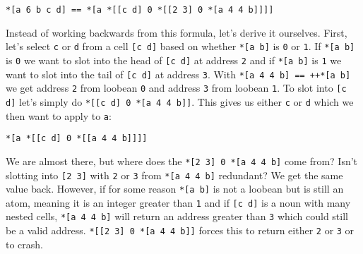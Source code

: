\documentclass[twoside]{article}
\begin{document}
\begin{lstlisting}[style=listingblock]
*[a 6 b c d] == *[a *[[c d] 0 *[[2 3] 0 *[a 4 4 b]]]]
\end{lstlisting}

Instead of working backwards from this formula, let's derive it ourselves. First, let's select \lstinline[style=inlinecode]{c} or \lstinline[style=inlinecode]{d} from a cell \lstinline[style=inlinecode]{[c d]} based on whether \lstinline[style=inlinecode]{*[a b]} is \lstinline[style=inlinecode]{0} or \lstinline[style=inlinecode]{1}. If \lstinline[style=inlinecode]{*[a b]} is \lstinline[style=inlinecode]{0} we want to slot into the head of \lstinline[style=inlinecode]{[c d]} at address \lstinline[style=inlinecode]{2} and if \lstinline[style=inlinecode]{*[a b]} is \lstinline[style=inlinecode]{1} we want to slot into the tail of \lstinline[style=inlinecode]{[c d]} at address \lstinline[style=inlinecode]{3}. With \lstinline[style=inlinecode]{*[a 4 4 b] == ++*[a b]} we get address \lstinline[style=inlinecode]{2} from loobean \lstinline[style=inlinecode]{0} and address \lstinline[style=inlinecode]{3} from loobean \lstinline[style=inlinecode]{1}. To slot into \lstinline[style=inlinecode]{[c d]} let's simply do \lstinline[style=inlinecode]{*[[c d] 0 *[a 4 4 b]]}. This gives us either \lstinline[style=inlinecode]{c} or \lstinline[style=inlinecode]{d} which we then want to apply to \lstinline[style=inlinecode]{a}:

\begin{lstlisting}[style=listingblock]
*[a *[[c d] 0 *[[a 4 4 b]]]]
\end{lstlisting}

We are almost there, but where does the \lstinline[style=inlinecode]{*[2 3] 0 *[a 4 4 b]} come from? Isn't slotting into \lstinline[style=inlinecode]{[2 3]} with \lstinline[style=inlinecode]{2} or \lstinline[style=inlinecode]{3} from \lstinline[style=inlinecode]{*[a 4 4 b]} redundant? We get the same value back. However, if for some reason \lstinline[style=inlinecode]{*[a b]} is not a loobean but is still an atom, meaning it is an integer greater than \lstinline[style=inlinecode]{1} and if \lstinline[style=inlinecode]{[c d]} is a noun with many nested cells, \lstinline[style=inlinecode]{*[a 4 4 b]} will return an address greater than \lstinline[style=inlinecode]{3} which could still be a valid address. \lstinline[style=inlinecode]{*[[2 3] 0 *[a 4 4 b]]} forces this to return either \lstinline[style=inlinecode]{2} or \lstinline[style=inlinecode]{3} or to crash.
\end{document}
